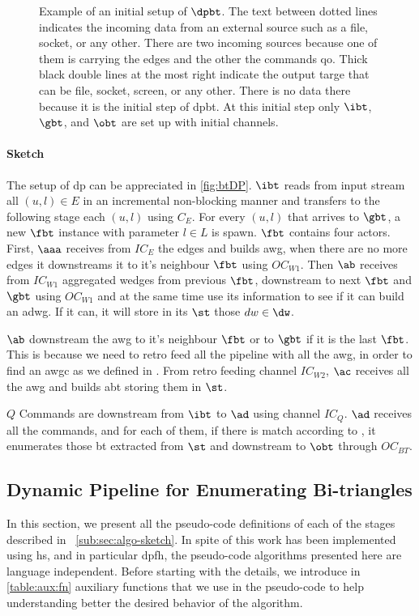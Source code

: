 \begin{figure}[h]
\centering  
{}
\caption[{[\acrshort{iebt}] $\dpbt$ Initial setup}]{Example of an initial setup of $\dpbt$. The text between dotted lines indicates the incoming data from an external source such as a file, socket, or any other. There are two incoming sources because one of them is carrying the edges and the other the commands \acrshort{qo}. Thick black double lines at the most right indicate the output targe that can be file, socket, screen, or any other. There is no data there because it is the initial step of \acrshort{dpbt}. At this initial step only $\ibt$, $\gbt$, and $\obt$ are set up with initial channels.}
\label{fig:btDP}
\end{figure}

\paragraph{Sketch} The setup of \acrshort{dp} can be appreciated in \autoref{fig:btDP}. $\ibt$ reads from input stream all $(u,l) \in E$ in an incremental non-blocking manner and transfers to the following stage each $(u,l)$ using $C_E$.
For every $(u,l)$ that arrives to $\gbt$, a new $\fbt$ instance with parameter $l \in L$ is spawn. $\fbt$ contains four actors. 
First, $\aaa$ receives from $IC_E$ the edges and builds \acrshort{awg}, when there are no more edges it downstreams it to it's neighbour $\fbt$ using $OC_{W1}$. 
Then $\ab$ receives from $IC_{W1}$ aggregated wedges from previous $\fbt$, downstream to next $\fbt$ and $\gbt$ using $OC_{W1}$ and at the same time use its information to see 
if it can build an \acrshort{adwg}. If it can, it will store in its $\st$ those $dw \in \dw$.

$\ab$ downstream the \acrshort{awg} to  it's neighbour $\fbt$ or to $\gbt$ if it is the last $\fbt$. This is because we need to retro feed all the pipeline with all the \acrshort{awg}, in order to find an \acrfull{awgc} as we defined in .
From retro feeding channel $IC_{W2}$, $\ac$ receives all the \acrshort{awg}  and builds \acrshort{abt} storing them in $\st$. 

$Q$ Commands are downstream from $\ibt$ to $\ad$ using channel $IC_Q$. $\ad$ receives all the commands, and for each of them, if there is match according to , it enumerates those \acrshort{bt} extracted from $\st$ and downstream to $\obt$ through $OC_{BT}$.

\subsection{Dynamic Pipeline for Enumerating Bi-triangles}
In this section, we present all the pseudo-code definitions of each of the stages described in ~\autoref{sub:sec:algo-sketch}. 
In spite of this work has been implemented using \acrshort{hs}, and in particular \acrshort{dpfh}, the pseudo-code algorithms presented here are language independent.
Before starting with the details, we introduce in \autoref{table:aux:fn} auxiliary functions that we use in the pseudo-code to help understanding better the desired behavior of the algorithm.

